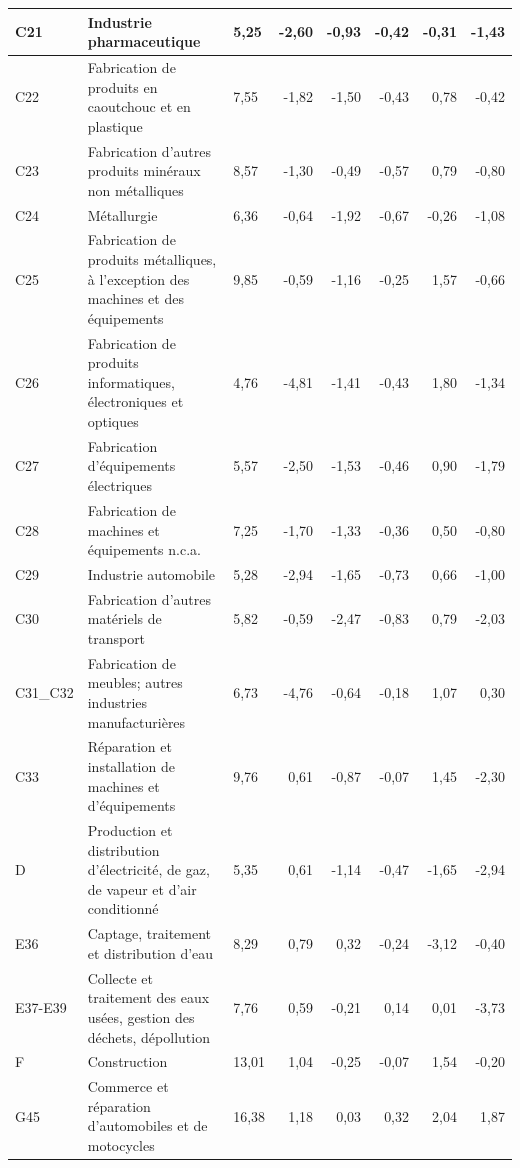 \begin{small}
\begin{longtable}{m{1.3cm}m{5.7cm}m{1cm}rrrrr}
	\hline
	C21 & Industrie pharmaceutique & 5,25 & -2,60 & -0,93 & -0,42 & -0,31 & -1,43 \\ 
	\hline
	C22 & Fabrication de produits en caoutchouc et en plastique & 7,55 & -1,82 & -1,50 & -0,43 & 0,78 & -0,42 \\ 
	\hline
	C23 & Fabrication d'autres produits minéraux non métalliques & 8,57 & -1,30 & -0,49 & -0,57 & 0,79 & -0,80 \\ 
	\hline
	C24 & Métallurgie & 6,36 & -0,64 & -1,92 & -0,67 & -0,26 & -1,08 \\ 
	\hline
	C25 & Fabrication de produits métalliques, à l'exception des machines et des équipements & 9,85 & -0,59 & -1,16 & -0,25 & 1,57 & -0,66 \\ 
	\hline
	C26 & Fabrication de produits informatiques, électroniques et optiques & 4,76 & -4,81 & -1,41 & -0,43 & 1,80 & -1,34 \\ 
	\hline
	C27 & Fabrication d'équipements électriques & 5,57 & -2,50 & -1,53 & -0,46 & 0,90 & -1,79 \\ 
	\hline
	C28 & Fabrication de machines et équipements n.c.a. & 7,25 & -1,70 & -1,33 & -0,36 & 0,50 & -0,80 \\ 
	\hline
	C29 & Industrie automobile & 5,28 & -2,94 & -1,65 & -0,73 & 0,66 & -1,00 \\ 
	\hline
	C30 & Fabrication d'autres matériels de transport & 5,82 & -0,59 & -2,47 & -0,83 & 0,79 & -2,03 \\ 
	\hline
	C31\_C32 & Fabrication de meubles; autres industries manufacturières & 6,73 & -4,76 & -0,64 & -0,18 & 1,07 & 0,30 \\ 
	\hline
	C33 & Réparation et installation de machines et d'équipements & 9,76 & 0,61 & -0,87 & -0,07 & 1,45 & -2,30 \\ 
	\hline
	D & Production et distribution d'électricité, de gaz, de vapeur et d'air conditionné & 5,35 & 0,61 & -1,14 & -0,47 & -1,65 & -2,94 \\ 
	\hline
	E36 & Captage, traitement et distribution d'eau & 8,29 & 0,79 & 0,32 & -0,24 & -3,12 & -0,40 \\ 
	\hline
	E37-E39 & Collecte et traitement des eaux usées, gestion des déchets, dépollution & 7,76 & 0,59 & -0,21 & 0,14 & 0,01 & -3,73 \\ 
	\hline
	F & Construction & 13,01 & 1,04 & -0,25 & -0,07 & 1,54 & -0,20 \\ 
	\hline
	G45 & Commerce et réparation d'automobiles et de motocycles & 16,38 & 1,18 & 0,03 & 0,32 & 2,04 & 1,87 \\ 

\end{longtable}
\end{small}
